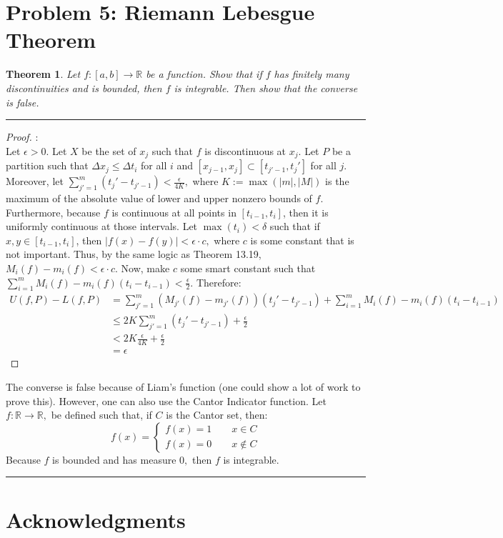 \documentclass[openany, amssymb, psamsfonts]{amsart}
\newcommand{\bbR}{\mathbb{R}}
\newtheorem{thm}{Theorem}[section]
\theoremstyle{definition}
\numberwithin{equation}{section}
\begin{document}
\section*{Problem 5: Riemann Lebesgue Theorem}
\begin{thm}
Let $f : [a, b] \to \bbR$ be a function. Show that if $f$ has finitely
many discontinuities and is bounded, then $f$ is integrable. Then show that the converse is false.
\end{thm}
\vspace{4pt}     \hrule   \vspace{4pt}\begin{proof}:\\
Let $\epsilon>0.$ Let $X$ be the set of $x_j$ such that $f$ is discontinuous at $x_j.$ Let $P$ be a partition such that $\Delta x_j \leq \Delta t_i$ for all $i$ and $[x_{j-1},x_j ]\subset [t_{j'-1}, t_j']$ for all $j.$ Moreover, let $\sum_{j'=1}^m (t_j' - t_{j'-1}) < \frac{\epsilon}{4K},$ where $K:= \max(|m|, |M|)$ is the maximum of the absolute value of lower and upper nonzero bounds of $f.$ Furthermore, because $f$ is continuous at all points in $[t_{i-1}, t_i]$, then it is uniformly continuous at those intervals. Let $\max(t_i)< \delta$ such that if $x,y\in [t_{i-1}, t_i]$, then $|f(x) - f(y)|<\epsilon \cdot c,$ where $c$ is some constant that is not important. Thus, by the same logic as Theorem 13.19, $M_i(f) - m_i(f)< \epsilon \cdot c.$ Now, make $c$ some smart constant such that $\sum_{i = 1} ^ m M_i(f) - m_i(f)(t_{i} - t_{i-1})< \frac{\epsilon}{2}.$ Therefore:
\begin{align*}
U(f,P) - L(f,P) &= \sum_{j'=1}^m (M_{j'}(f) - m_{j'}(f))(t_j' - t_{j'-1}) + \sum_{i = 1} ^ m M_i(f) - m_i(f)(t_{i} - t_{i-1})\\
&\leq 2K \sum_{j'=1}^m (t_j' - t_{j'-1}) + \frac{\epsilon}{2}\\
&< 2K\frac{\epsilon}{4K} + \frac{\epsilon}{2}\\
&= \epsilon
\end{align*}
\end{proof}
The converse is false because of Liam's function (one could show a lot of work to prove this). However, one can also use the Cantor Indicator function. Let $f:\bbR \to \bbR,$ be defined such that, if $C$ is the Cantor set, then:
\[f(x) = \begin{cases}
f(x) = 1\qquad x\in C\\
f(x) = 0\qquad x\notin C
\end{cases}\]
Because $f$ is bounded and has measure $0,$ then $f$ is integrable. 
\vspace{4pt}     \hrule   \vspace{4pt}

\section*{Acknowledgments} 
\begin{thebibliography}{9}




\end{thebibliography}
\end{document}

